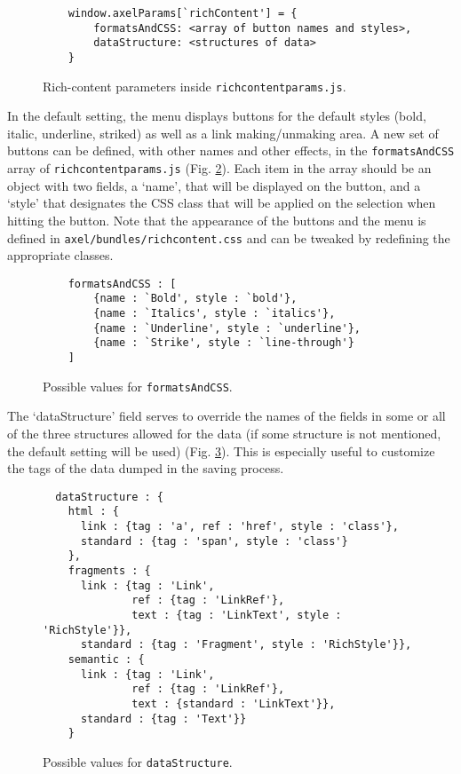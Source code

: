 \documentclass[11pt,a4paper]{article}
\begin{document}
\begin{figure}[h!]
  \centering

\begin{verbatim}
    window.axelParams[`richContent'] = {
        formatsAndCSS: <array of button names and styles>, 
        dataStructure: <structures of data>
    }
\end{verbatim}

  \caption{Rich-content parameters inside \texttt{richcontentparams.js}.}
  \label{params}
\end{figure}


In the default setting, the menu displays buttons for the default styles (bold, italic, underline, striked) as well as a link making/unmaking area. A new set of buttons can be defined, with other names and other effects, in the \texttt{formatsAndCSS} array of \texttt{richcontentparams.js} (Fig. \ref{formatsAndCSS}). Each item in the array should be an object with two fields, a `name', that will be displayed on the button, and a `style' that designates the CSS class that will be applied on the selection when hitting the button. Note that the appearance of the buttons and the menu is defined in \texttt{axel/bundles/richcontent.css} and can be tweaked by redefining the appropriate classes.

\begin{figure}[h!]
  \centering

\begin{verbatim}
    formatsAndCSS : [
        {name : `Bold', style : `bold'},
        {name : `Italics', style : `italics'},
        {name : `Underline', style : `underline'},
        {name : `Strike', style : `line-through'}
    ]
\end{verbatim}


  \caption{Possible values for \texttt{formatsAndCSS}.}
  \label{formatsAndCSS}
\end{figure}

The `dataStructure' field serves to override the names of the fields in some or all of the three structures allowed for the data (if some structure is not mentioned, the default setting will be used) (Fig. \ref{dataStructure}). This is especially useful to customize the tags of the data dumped in the saving process.

\begin{figure}[h!]
  \centering


\begin{verbatim}
  dataStructure : {
    html : {
      link : {tag : 'a', ref : 'href', style : 'class'},
      standard : {tag : 'span', style : 'class'}
    },
    fragments : {
      link : {tag : 'Link', 
              ref : {tag : 'LinkRef'}, 
              text : {tag : 'LinkText', style : 'RichStyle'}},
      standard : {tag : 'Fragment', style : 'RichStyle'}},
    semantic : {
      link : {tag : 'Link', 
              ref : {tag : 'LinkRef'}, 
              text : {standard : 'LinkText'}},
      standard : {tag : 'Text'}}
    }
\end{verbatim} 


  \caption{Possible values for \texttt{dataStructure}.}
  \label{dataStructure}
\end{figure}
\end{document}
